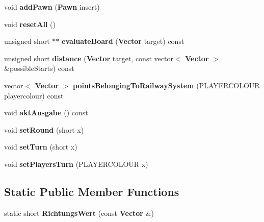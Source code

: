 \begin{DoxyCompactItemize}
\item 
void {\bfseries add\-Pawn} ({\bf Pawn} insert)\label{class_state_a9a192466fc65d42a405b6c461f5ae1c7}

\item 
void {\bfseries reset\-All} ()\label{class_state_ae3cf3d6f8fd90d8a59d53ccb1290a46c}

\item 
unsigned short $\ast$$\ast$ {\bfseries evaluate\-Board} ({\bf Vector} target) const \label{class_state_a5bc0dd359e67c72d457a64277afaf621}

\item 
unsigned short {\bfseries distance} ({\bf Vector} target, const vector$<$ {\bf Vector} $>$ \&possible\-Starts) const \label{class_state_a2e17c63ec7373cf144f37933bef1d197}

\item 
vector$<$ {\bf Vector} $>$ {\bfseries points\-Belonging\-To\-Railway\-System} (P\-L\-A\-Y\-E\-R\-C\-O\-L\-O\-U\-R playercolour) const \label{class_state_ab039ad1b0cb7721e26946c79faff16d5}

\item 
void {\bfseries akt\-Ausgabe} () const \label{class_state_ade0adf3c0871edde2df2370718f0c8f6}

\item 
void {\bfseries set\-Round} (short x)\label{class_state_a468eb35199b879f9df58245540ca849c}

\item 
void {\bfseries set\-Turn} (short x)\label{class_state_a5f8cd95cb039eb5333a9fed80b7efd2f}

\item 
void {\bfseries set\-Players\-Turn} (P\-L\-A\-Y\-E\-R\-C\-O\-L\-O\-U\-R x)\label{class_state_af71c2a4c5a5c3969d3a6ac61e4d4e6d4}

\end{DoxyCompactItemize}
\subsection*{Static Public Member Functions}
\begin{DoxyCompactItemize}
\item 
static short {\bfseries Richtungs\-Wert} (const {\bf Vector} \&)\label{class_state_ac1f87995c4da93c0a24f0d5564b8644c}

\end{DoxyCompactItemize}
